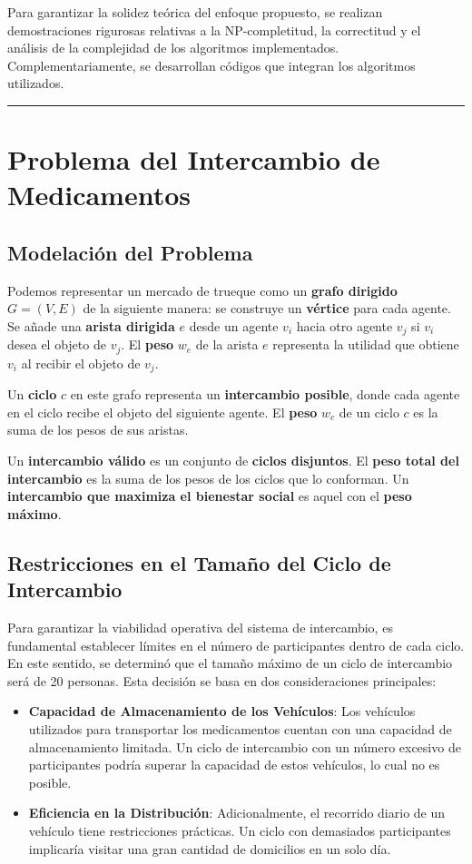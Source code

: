 \documentclass[twocolumn, fontsize=10pt]{article}
\begin{document}
Para garantizar la solidez teórica del enfoque propuesto, se realizan demostraciones rigurosas relativas a la NP-completitud, la correctitud y el análisis de la complejidad de los algoritmos implementados. Complementariamente, se desarrollan códigos que integran los algoritmos utilizados.


\rule{\linewidth}{0.5pt}


\section{Problema del Intercambio de Medicamentos}

\subsection{Modelación del Problema}

Podemos representar un mercado de trueque como un \textbf{grafo dirigido} \( G = (V, E) \) de la siguiente manera: se construye un \textbf{vértice} para cada agente. Se añade una \textbf{arista dirigida} \( e \) desde un agente \( v_i \) hacia otro agente \( v_j \) si \( v_i \) desea el objeto de \( v_j \). El \textbf{peso} \( w_e \) de la arista \( e \) representa la utilidad que obtiene \( v_i \) al recibir el objeto de \( v_j \).  

Un \textbf{ciclo} \( c \) en este grafo representa un \textbf{intercambio posible}, donde cada agente en el ciclo recibe el objeto del siguiente agente. El \textbf{peso} \( w_c \) de un ciclo \( c \) es la suma de los pesos de sus aristas.  

Un \textbf{intercambio válido} es un conjunto de \textbf{ciclos disjuntos}. El \textbf{peso total del intercambio} es la suma de los pesos de los ciclos que lo conforman. Un \textbf{intercambio que maximiza el bienestar social} es aquel con el \textbf{peso máximo}. 

\subsection{Restricciones en el Tamaño del Ciclo de Intercambio}

Para garantizar la viabilidad operativa del sistema de intercambio, es fundamental establecer límites en el número de participantes dentro de cada ciclo. En este sentido, se determinó que el tamaño máximo de un ciclo de intercambio será de 20 personas. Esta decisión se basa en dos consideraciones principales:
\begin{itemize}
    \item \textbf{Capacidad de Almacenamiento de los Vehículos}: Los vehículos utilizados para transportar los medicamentos cuentan con una capacidad de almacenamiento limitada. Un ciclo de intercambio con un número excesivo de participantes podría superar la capacidad de estos vehículos, lo cual no es posible.
    \item  \textbf{Eficiencia en la Distribución}: Adicionalmente, el recorrido diario de un vehículo tiene restricciones prácticas. Un ciclo con demasiados participantes implicaría visitar una gran cantidad de domicilios en un solo día.
\end{itemize}
    
\end{document}
